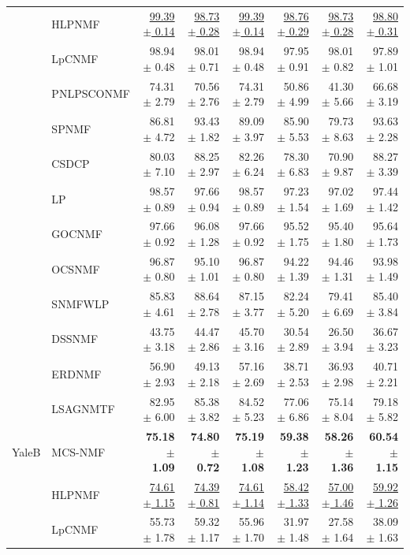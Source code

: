 \begin{landscape}
\begin{longtable}{llrrrrrr}
 & HLPNMF & \underline{99.39 $\pm$ 0.14} & \underline{98.73 $\pm$ 0.28} & \underline{99.39 $\pm$ 0.14} & \underline{98.76 $\pm$ 0.29} & \underline{98.73 $\pm$ 0.28} & \underline{98.80 $\pm$ 0.31} \\
 & LpCNMF & 98.94 $\pm$ 0.48 & 98.01 $\pm$ 0.71 & 98.94 $\pm$ 0.48 & 97.95 $\pm$ 0.91 & 98.01 $\pm$ 0.82 & 97.89 $\pm$ 1.01 \\
 & PNLPSCONMF & 74.31 $\pm$ 2.79 & 70.56 $\pm$ 2.76 & 74.31 $\pm$ 2.79 & 50.86 $\pm$ 4.99 & 41.30 $\pm$ 5.66 & 66.68 $\pm$ 3.19 \\
 & SPNMF & 86.81 $\pm$ 4.72 & 93.43 $\pm$ 1.82 & 89.09 $\pm$ 3.97 & 85.90 $\pm$ 5.53 & 79.73 $\pm$ 8.63 & 93.63 $\pm$ 2.28 \\
 & CSDCP & 80.03 $\pm$ 7.10 & 88.25 $\pm$ 2.97 & 82.26 $\pm$ 6.24 & 78.30 $\pm$ 6.83 & 70.90 $\pm$ 9.87 & 88.27 $\pm$ 3.39 \\
 & LP & 98.57 $\pm$ 0.89 & 97.66 $\pm$ 0.94 & 98.57 $\pm$ 0.89 & 97.23 $\pm$ 1.54 & 97.02 $\pm$ 1.69 & 97.44 $\pm$ 1.42 \\
 & GOCNMF & 97.66 $\pm$ 0.92 & 96.08 $\pm$ 1.28 & 97.66 $\pm$ 0.92 & 95.52 $\pm$ 1.75 & 95.40 $\pm$ 1.80 & 95.64 $\pm$ 1.73 \\
 & OCSNMF & 96.87 $\pm$ 0.80 & 95.10 $\pm$ 1.01 & 96.87 $\pm$ 0.80 & 94.22 $\pm$ 1.39 & 94.46 $\pm$ 1.31 & 93.98 $\pm$ 1.49 \\
 & SNMFWLP & 85.83 $\pm$ 4.61 & 88.64 $\pm$ 2.78 & 87.15 $\pm$ 3.77 & 82.24 $\pm$ 5.20 & 79.41 $\pm$ 6.69 & 85.40 $\pm$ 3.84 \\
 & DSSNMF & 43.75 $\pm$ 3.18 & 44.47 $\pm$ 2.86 & 45.70 $\pm$ 3.16 & 30.54 $\pm$ 2.89 & 26.50 $\pm$ 3.94 & 36.67 $\pm$ 3.23 \\
 & ERDNMF & 56.90 $\pm$ 2.93 & 49.13 $\pm$ 2.18 & 57.16 $\pm$ 2.69 & 38.71 $\pm$ 2.53 & 36.93 $\pm$ 2.98 & 40.71 $\pm$ 2.21 \\
 & LSAGNMTF & 82.95 $\pm$ 6.00 & 85.38 $\pm$ 3.82 & 84.52 $\pm$ 5.23 & 77.06 $\pm$ 6.86 & 75.14 $\pm$ 8.04 & 79.18 $\pm$ 5.82 \\
\midrule
YaleB & MCS-NMF & \textbf{75.18 $\pm$ 1.09} & \textbf{74.80 $\pm$ 0.72} & \textbf{75.19 $\pm$ 1.08} & \textbf{59.38 $\pm$ 1.23} & \textbf{58.26 $\pm$ 1.36} & \textbf{60.54 $\pm$ 1.15} \\
 & HLPNMF & \underline{74.61 $\pm$ 1.15} & \underline{74.39 $\pm$ 0.81} & \underline{74.61 $\pm$ 1.14} & \underline{58.42 $\pm$ 1.33} & \underline{57.00 $\pm$ 1.46} & \underline{59.92 $\pm$ 1.26} \\
 & LpCNMF & 55.73 $\pm$ 1.78 & 59.32 $\pm$ 1.17 & 55.96 $\pm$ 1.70 & 31.97 $\pm$ 1.48 & 27.58 $\pm$ 1.64 & 38.09 $\pm$ 1.63 \\

\end{longtable}
\end{landscape}
